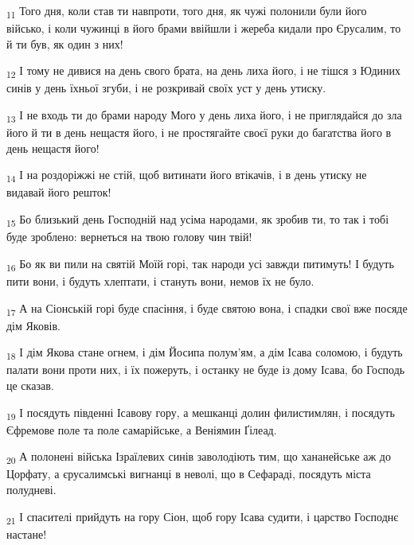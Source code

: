 \begin{tcolorbox}
\textsubscript{11} Того дня, коли став ти навпроти, того дня, як чужі полонили були його військо, і коли чужинці в його брами ввійшли і жереба кидали про Єрусалим, то й ти був, як один з них!
\end{tcolorbox}
\begin{tcolorbox}
\textsubscript{12} І тому не дивися на день свого брата, на день лиха його, і не тішся з Юдиних синів у день їхньої згуби, і не розкривай своїх уст у день утиску.
\end{tcolorbox}
\begin{tcolorbox}
\textsubscript{13} І не входь ти до брами народу Мого у день лиха його, і не приглядайся до зла його й ти в день нещастя його, і не простягайте своєї руки до багатства його в день нещастя його!
\end{tcolorbox}
\begin{tcolorbox}
\textsubscript{14} І на роздоріжжі не стій, щоб витинати його втікачів, і в день утиску не видавай його решток!
\end{tcolorbox}
\begin{tcolorbox}
\textsubscript{15} Бо близький день Господній над усіма народами, як зробив ти, то так і тобі буде зроблено: вернеться на твою голову чин твій!
\end{tcolorbox}
\begin{tcolorbox}
\textsubscript{16} Бо як ви пили на святій Моїй горі, так народи усі завжди питимуть! І будуть пити вони, і будуть хлептати, і стануть вони, немов їх не було.
\end{tcolorbox}
\begin{tcolorbox}
\textsubscript{17} А на Сіонській горі буде спасіння, і буде святою вона, і спадки свої вже посяде дім Яковів.
\end{tcolorbox}
\begin{tcolorbox}
\textsubscript{18} І дім Якова стане огнем, і дім Йосипа полум'ям, а дім Ісава соломою, і будуть палати вони проти них, і їх пожеруть, і останку не буде із дому Ісава, бо Господь це сказав.
\end{tcolorbox}
\begin{tcolorbox}
\textsubscript{19} І посядуть південні Ісавову гору, а мешканці долин филистимлян, і посядуть Єфремове поле та поле самарійське, а Веніямин Ґілеад.
\end{tcolorbox}
\begin{tcolorbox}
\textsubscript{20} А полонені війська Ізраїлевих синів заволодіють тим, що хананейське аж до Цорфату, а єрусалимські вигнанці в неволі, що в Сефараді, посядуть міста полудневі.
\end{tcolorbox}
\begin{tcolorbox}
\textsubscript{21} І спасителі прийдуть на гору Сіон, щоб гору Ісава судити, і царство Господнє настане!
\end{tcolorbox}
